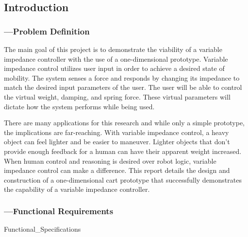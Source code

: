 \subsection*{Introduction}

\subsubsection*{---Problem Definition} \par
The main goal of this project is to demonstrate the viability of a variable impedance controller with the use of a one-dimensional prototype. Variable impedance control utilizes user input in order to achieve a desired state of mobility. The system senses a force and responds by changing its impedance to match the desired input parameters of the user. The user will be able to control the virtual weight, damping, and spring force. These virtual parameters will dictate how the system performs while being used. \par
There are many applications for this research and while only a simple prototype, the implications are far-reaching. With variable impedance control, a heavy object can feel lighter and be easier to maneuver. Lighter objects that don't provide enough feedback for a human can have their apparent weight increased. When human control and reasoning is desired over robot logic, variable impedance control can make a difference. This report details the design and construction of a one-dimensional cart prototype that successfully demonstrates the capability of a variable impedance controller.\par

\subsubsection*{---Functional Requirements} \par
 {Functional_Specifications}

